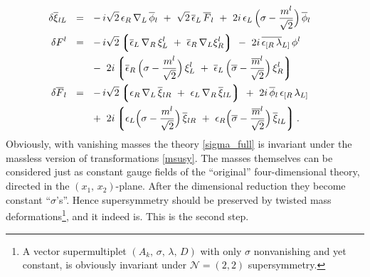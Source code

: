 \documentclass[12pt]{article}
\newcommand{\ntwot}{${\mathcal N}= \left(2,2\right) $ }
\newcommand{\ov}{\overline}
\newcommand{\lgr}{\left\lgroup}
\newcommand{\rgr}{\right\rgroup}
\newcommand{\eer}{\epsilon_R}
\newcommand{\eel}{\epsilon_L}
\newcommand{\beer}{\ov{\epsilon}{}_R}
\newcommand{\beel}{\ov{\epsilon}{}_L}
\begin{document}
\begin{align}
     \\
%
\notag
  \delta\ov{\xi}{}_{lL} & ~~=~~
     -\, i\sqrt{2}\, \eer\, \nabla_L\, \ov{\phi}{}_l
     ~+~ \sqrt{2}\, \beel\, \ov{F}{}_l
     ~+~ 2i\, \eel\, \Bigl(\sigma - \frac{m^l}{\sqrt{2}}\Bigr)\, \ov{\phi}{}_l
     \\
%
\notag
  \delta F^l & ~~=~~
     -\,i\sqrt{2} \lgr \beel\, \nabla_R\, \xi_L^l ~+~ \beer\, \nabla_L \xi_R^l \rgr
     ~-~ 2i\, \ov{\epsilon_{[R}\, \lambda}{}_{L]}\, \phi^l
     \\
\notag
     & \phantom{~~=~~}
     ~-~ 2i \lgr \beer\, \Bigl(\sigma - \frac{m^l}{\sqrt{2}}\Bigr)\, \xi_L^l 
             ~+~ \beel\, \Bigl(\ov{\sigma} - \frac{\ov{m}{}^l}{\sqrt{2}}\Bigr)\, \xi_R^l \rgr 
     \\
%
\notag
  \delta \ov{F}{}_l & ~~=~~
     -\,i\sqrt{2} \lgr \eer\, \nabla_L\, \ov{\xi}{}_{lR} ~+~ 
                       \eel\, \nabla_R\, \ov{\xi}{}_{lL} \rgr
     ~+~ 2i\,\ov{\phi}{}_l\, \epsilon_{[R}\, \lambda_{L]} 
     \\
\notag
     & \phantom{~~=~~}
     ~+~ 2i \lgr \eel \Bigl(\sigma - \frac{m^l}{\sqrt{2}}\Bigr)\, \ov{\xi}{}_{lR} 
             ~+~ \eer \Bigl(\ov{\sigma} - \frac{\ov{m}{}^l}{\sqrt{2}}\Bigr)\, 
                            \ov{\xi}_{lL} \rgr .
\end{align}
	Obviously, with vanishing masses the theory \eqref{sigma_full} is invariant
	under the massless version of transformations \eqref{msusy}.
	The masses themselves can be considered just as constant gauge fields of
	the ``original'' four-dimensional theory, directed in the $ (x_1,\, x_2) $-plane.
	After the dimensional reduction they become constant ``$\sigma$'s''.
	Hence supersymmetry should be preserved by twisted mass deformations\footnote{
          A vector supermultiplet $(A_k,\,\sigma,\,\lambda,\,D)$ with only 
          $ \sigma $ nonvanishing and yet constant, is obviously invariant under \ntwot supersymmetry.}, 
	and it indeed is.
	This is the second step.
\end{document}
